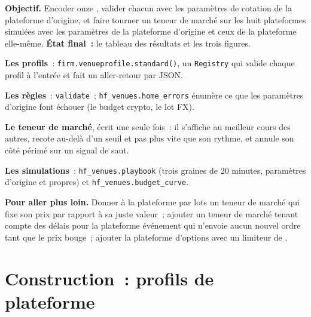 \begin{tutorial}
\textbf{Objectif.} Encoder onze , valider chacun avec les paramètres de cotation de la plateforme d'origine, et faire tourner un teneur de marché sur les huit plateformes simulées
avec les paramètres de la plateforme d'origine et ceux de la plateforme elle-même. \textbf{État final~:} le tableau des résultats et les trois figures.
\begin{tutsteps}
\item \textbf{Les profils}~: \texttt{firm.venueprofile.standard()}, un \texttt{Registry} qui valide chaque profil à l'entrée et fait un aller-retour par
JSON.
\item \textbf{Les règles}~: \texttt{validate}~; \texttt{hf\_venues.home\_errors} énumère ce que les paramètres d'origine font échouer (le budget crypto, le lot FX).
\label{lst:hf:a-venue-playbook:validate}
\item \textbf{Le teneur de marché}, écrit une seule fois~: il s'affiche au meilleur cours des autres, recote au-delà d'un seuil et pas plus vite que son rythme, et annule
son côté périmé sur un signal de saut.
\label{lst:hf:a-venue-playbook:quoter}
\item \textbf{Les simulations}~: \texttt{hf\_venues.playbook} (trois graines de 20 minutes, paramètres d'origine et propres) et \texttt{hf\_venues.budget\_curve}.
\end{tutsteps}
\textbf{Pour aller plus loin.} Donner à la plateforme par lots un teneur de marché qui fixe son prix par rapport à sa juste valeur~; ajouter un teneur de marché tenant compte des délais pour la plateforme événement qui
n'envoie aucun nouvel ordre tant que le prix bouge~; ajouter la plateforme d'options avec un limiteur de .
\end{tutorial}

\section{Construction~: profils de plateforme}\label{bld:hf:a-venue-playbook:venueprofile}

